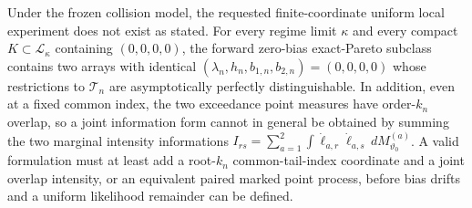 Under the frozen collision model, the requested finite-coordinate uniform local experiment does not exist as stated.  For every regime limit \(\kappa\) and every compact \(K\subset\mathcal L_\kappa\) containing \((0,0,0,0)\), the forward zero-bias exact-Pareto subclass contains two arrays with identical \((\lambda_n,h_n,b_{1,n},b_{2,n})=(0,0,0,0)\) whose restrictions to \(\mathcal T_n\) are asymptotically perfectly distinguishable.  In addition, even at a fixed common index, the two exceedance point measures have order-\(k_n\) overlap, so a joint information form cannot in general be obtained by summing the two marginal intensity informations \(I_{rs}=\sum_{a=1}^2\int\dot\ell_{a,r}\dot\ell_{a,s}\,dM_{\vartheta_0}^{(a)}\).  A valid formulation must at least add a root-\(k_n\) common-tail-index coordinate and a joint overlap intensity, or an equivalent paired marked point process, before bias drifts and a uniform likelihood remainder can be defined.